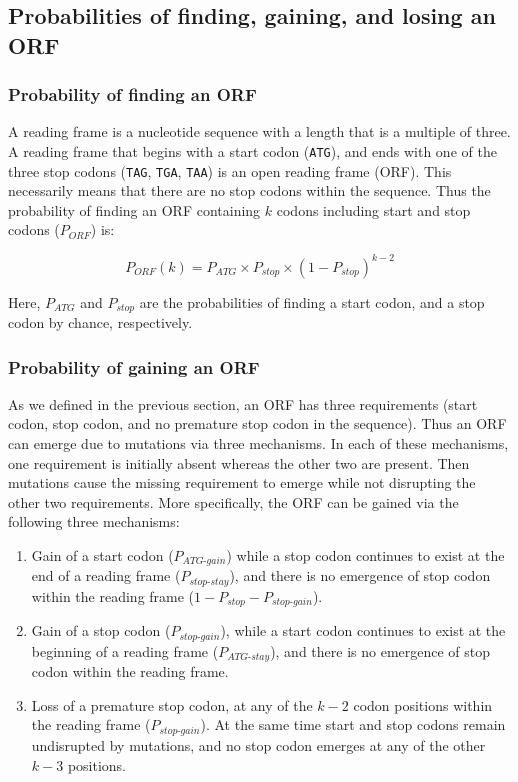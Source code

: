 \documentclass[12pt,a4paper]{article}
\begin{document}
\subsection{Probabilities of finding, gaining, and losing an ORF}

\label{methORF}

\subsubsection{Probability of finding an ORF}

A reading frame is a nucleotide sequence with a length that is a multiple of three. A reading frame that begins with a start codon (\texttt{ATG}), and ends with one of the three stop codons (\texttt{TAG}, \texttt{TGA}, \texttt{TAA}) is an open reading frame (ORF). This necessarily means that there are no stop codons within the sequence. Thus the probability of finding an ORF containing $k$ codons including start and stop codons ($P_\textit{ORF}$) is: 

\begin{equation}
P_\textit{ORF}(k) = P_\textit{ATG} \times P_\textit{stop} \times (1 - P_\textit{stop})^{k-2}
\label{eqorfprob}
\end{equation}

Here, $P_\textit{ATG}$ and $P_\textit{stop}$ are the probabilities of finding a start codon, and a stop codon by chance, respectively.

\subsubsection{Probability of gaining an ORF}

As we defined in the previous section, an ORF has three requirements (start codon, stop codon, and no premature stop codon in the sequence). Thus an ORF can emerge due to mutations via three mechanisms. In each of these mechanisms, one requirement is initially absent whereas the other two are present. Then mutations cause the missing requirement to emerge while not disrupting the other two requirements. More specifically, the ORF can be gained via the following three mechanisms:
\begin{enumerate}
\item Gain of a start codon ($P_\textit{ATG-gain}$) while a stop codon continues to exist at the end of a reading frame ($P_\textit{stop-stay}$), and there is no emergence of stop codon within the reading frame ($1- P_\textit{stop} - P_\textit{stop-gain}$).
\item Gain of a stop codon ($P_\textit{stop-gain}$), while a start codon continues to exist at the beginning of a reading frame ($P_\textit{ATG-stay}$), and there is no emergence of stop codon within the reading frame.
\item Loss of a premature stop codon, at any of the $k-2$ codon positions within the reading frame ($P_\textit{stop-gain}$). At the same time start and stop codons remain undisrupted by mutations, and no stop codon emerges at any of the other $k-3$ positions.
\end{enumerate} 
\end{document}
